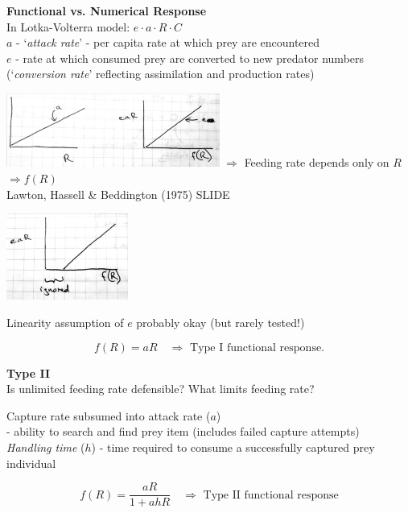 \documentclass{article}
\newcommand{\note}[1]{\colorbox{gray!30}{#1}}
\newcommand{\ind}{\-\hspace{1cm}}
\begin{document}
\textbf{Functional vs. Numerical Response}\\
In Lotka-Volterra model: \ind $e \cdot a \cdot R \cdot C$\\
\ind $a$ - `\emph{attack rate}' - per capita rate at which prey are encountered\\ 
\ind $e$ - rate at which consumed prey are converted to new predator numbers \\
\ind \ind (`\emph{conversion rate}' reflecting assimilation and production rates)

\includegraphics[width=7cm]{figs/FR_T1.pdf}
$\Rightarrow$ Feeding rate depends only on $R$ $\Rightarrow f(R)$\\

\pagebreak
Lawton, Hassell \& Beddington (1975) \note{SLIDE}
\begin{center}
\includegraphics[width=4cm]{figs/FR_conv.pdf}
\end{center}
Linearity assumption of $e$ probably okay (but rarely tested!)

\begin{equation*}
	f(R) = a R   \quad \Rightarrow \text{ Type I functional response}. 
\end{equation*}

\textbf{Type II}\\
Is unlimited feeding rate defensible?  What limits feeding rate?

\ind Capture rate subsumed into attack rate ($a$)\\
\ind \ind - ability to search and find prey item (includes failed capture attempts)\\
\ind \emph{Handling time} ($h$) - time required to consume a successfully captured prey individual

\begin{equation*}
	f(R)=\frac{aR}{1+ahR} \quad  \Rightarrow \text{ Type II functional response}
\end{equation*}
\end{document}
